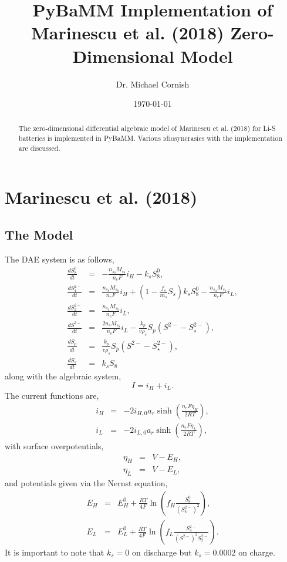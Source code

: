 \documentclass[11pt,twoside,a4paper]{article}
\begin{document}
\title{PyBaMM Implementation of Marinescu et al. (2018) Zero-Dimensional Model}
\author{Dr. Michael Cornish}
\date{\today}
\maketitle

\begin{abstract}
The zero-dimensional differential algebraic model of Marinescu et al. (2018) for Li-S batteries is implemented in PyBaMM. Various idiosyncrasies with the implementation are discussed.  
\end{abstract}

\section{Marinescu et al. (2018)}
\subsection{The Model}
The DAE system is as follows,
%
\begin{eqnarray}
\frac{dS_8^0}{dt} &=& -\frac{n_{s_8}M_{s_8}}{n_eF}i_H - k_sS_8^0 ,\\
\frac{dS_4^{2-}}{dt} &=& \frac{n_{s_8}M_{s_8}}{n_eF}i_H + \left(1-\frac{f_s}{m_s}S_s\right)k_sS_8^0 -\frac{n_{s_4}M_{s_8}}{n_eF}i_L,\\
\frac{dS_2^{2-}}{dt} &=& \frac{n_{s_2}M_{s_8}}{n_eF}i_L ,\\
\frac{dS^{2-}}{dt} &=& \frac{2n_{s}M_{s_8}}{n_eF}i_L -\frac{k_p}{v\rho_s}S_p(S^{2-}-S^{2-}_{\star}) ,\\ 
\frac{dS_p}{dt} &=& \frac{k_p}{v\rho_s}S_p(S^{2-}-S^{2-}_{\star}), \\
\frac{dS_s}{dt} &=& k_sS_8
\end{eqnarray}
%
along with the algebraic system,
%
\begin{equation}
I = i_H + i_L.
\end{equation}
%
The current functions are, 
%
\begin{eqnarray}
i_H &=& -2i_{H,0}a_r\sinh\left(\frac{n_eF\eta_H}{2RT}\right), \\
i_L &=& -2i_{L,0}a_r\sinh\left(\frac{n_eF\eta_L}{2RT}\right),
\end{eqnarray}
%
with surface overpotentials,
%
\begin{eqnarray}
\eta_H &=& V-E_H ,\\
\eta_L &=& V-E_L,
\end{eqnarray}
%
and potentials given via the Nernst equation, 
%
\begin{eqnarray}
E_H &=& E_H^0 + \frac{RT}{4F}\ln\left(f_H\frac{S_8^0}{(S_4^{2-})^2}\right) ,\\
E_L &=& E_L^0 + \frac{RT}{4F}\ln\left(f_L\frac{S_4^{2-}}{(S^{2-})^2S_2^{2-}}\right).
\end{eqnarray}
%
It is important to note that $k_s = 0$ on discharge but $k_s = 0.0002$ on charge. 
\end{document}
